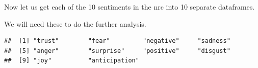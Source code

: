 \documentclass[]{article}
\newenvironment{Shaded}{\begin{snugshade}}{\end{snugshade}}
\newcommand{\KeywordTok}[1]{\textcolor[rgb]{0.13,0.29,0.53}{\textbf{#1}}}
\newcommand{\StringTok}[1]{\textcolor[rgb]{0.31,0.60,0.02}{#1}}
\newcommand{\OperatorTok}[1]{\textcolor[rgb]{0.81,0.36,0.00}{\textbf{#1}}}
\newcommand{\NormalTok}[1]{#1}
\begin{document}
Now let us get each of the 10 sentiments in the nrc into 10 separate
dataframes.

We will need these to do the further analysis.

\begin{Shaded}
\end{Shaded}

\begin{verbatim}
##  [1] "trust"        "fear"         "negative"     "sadness"     
##  [5] "anger"        "surprise"     "positive"     "disgust"     
##  [9] "joy"          "anticipation"
\end{verbatim}

\begin{Shaded}
\end{Shaded}
\end{document}

